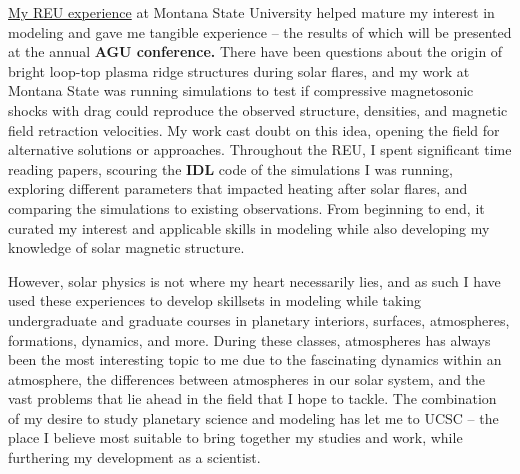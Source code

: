 \documentclass[11pt,letterpaper]{article}
\begin{document}
\href{http://solar.physics.montana.edu/www/reu/2021/mccreery/}{My REU experience} at Montana State University helped mature my interest in modeling and gave me tangible experience – the results of which will be presented at the annual \textbf{AGU conference.} There have been questions about the origin of bright loop-top plasma ridge structures during solar flares, and my work at Montana State was running simulations to test if compressive magnetosonic shocks with drag could reproduce the observed structure, densities, and magnetic field retraction velocities. My work cast doubt on this idea, opening the field for alternative solutions or approaches. Throughout the REU, I spent significant time reading papers, scouring the \textbf{IDL} code of the simulations I was running, exploring different parameters that impacted heating after solar flares, and comparing the simulations to existing observations. From beginning to end, it curated my interest and applicable skills in modeling while also developing my knowledge of solar magnetic structure. 

However, solar physics is not where my heart necessarily lies, and as such I have used these experiences to develop skillsets in modeling while taking undergraduate and graduate courses in planetary interiors, surfaces, atmospheres, formations, dynamics, and more. During these classes, atmospheres has always been the most interesting topic to me due to the fascinating dynamics within an atmosphere, the differences between atmospheres in our solar system, and the vast problems that lie ahead in the field that I hope to tackle. The combination of my desire to study planetary science and modeling has let me to UCSC -- the place I believe most suitable to bring together my studies and work, while furthering my development as a scientist.
\end{document}
